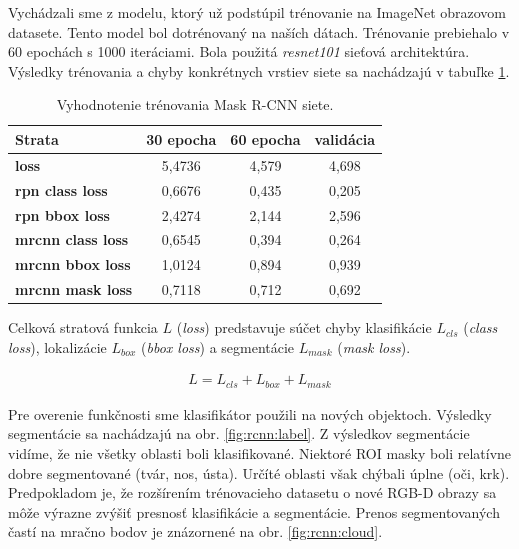 Vychádzali sme z modelu, ktorý už podstúpil trénovanie na ImageNet obrazovom datasete. Tento model bol dotrénovaný na naších dátach. Trénovanie prebiehalo v 60 epochách s  1000 iteráciami. Bola použitá \textit{resnet101} sieťová architektúra. Výsledky trénovania a chyby konkrétnych vrstiev siete sa nachádzajú v tabuľke \ref{tab:rcnn:results}. 

\begin{table}[h]
	\caption{\label{tab:rcnn:results} Vyhodnotenie trénovania Mask R-CNN siete.}
	\centering
	\begin{tabular}{lccc}
		\toprule
		\textbf{Strata} & \textbf{30 epocha} & \textbf{60 epocha} & \textbf{validácia} \\ 
		\midrule
		\textbf{loss} 					& 5,4736 	& 4,579 & 4,698	\\
		\textbf{rpn class loss} 		& 0,6676 	& 0,435 & 0,205	\\
		\textbf{rpn bbox loss} 			& 2,4274	& 2,144 & 2,596	\\
		\textbf{mrcnn class loss} 		& 0,6545	& 0,394 & 0,264	\\
		\textbf{mrcnn bbox loss} 		& 1,0124	& 0,894	& 0,939	\\
		\textbf{mrcnn mask loss} 		& 0,7118	& 0,712	& 0,692	\\
		\bottomrule
	\end{tabular}
\end{table}

Celková stratová funkcia $L$ (\textit{loss}) predstavuje súčet chyby klasifikácie $L_{cls}$ (\textit{class loss}), lokalizácie $L_{box}$ (\textit{bbox loss}) a segmentácie $ L_{mask}$ (\textit{mask loss}). 

\begin{equation}
\label{eq:loss}
\begin{aligned}
L = L_{cls} + L_{box} + L_{mask}
\end{aligned}
\end{equation}

Pre overenie funkčnosti sme klasifikátor použili na nových objektoch. Výsledky segmentácie sa nachádzajú na obr. \ref{fig:rcnn:label}. Z výsledkov segmentácie vidíme, že nie všetky oblasti boli klasifikované.
Niektoré ROI masky boli relatívne dobre segmentované (tvár, nos, ústa). Určíté oblasti však chýbali úplne (oči, krk). Predpokladom je, že rozšírením trénovacieho datasetu o nové RGB-D obrazy sa môže výrazne zvýšiť presnosť klasifikácie a segmentácie. Prenos segmentovaných častí na mračno bodov je znázornené na obr. \ref{fig:rcnn:cloud}.

